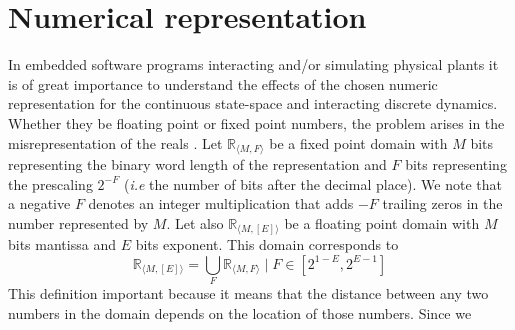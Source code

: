 \documentclass[sigconf]{llncs}
\newcommand{\jrronly}[1]{{}}
\begin{document}
\section{Numerical representation} 
\label{sec:numeric_rep}

In embedded software programs interacting and/or simulating physical plants
it is of great importance to understand the effects of the chosen numeric 
representation for the continuous state-space and interacting discrete dynamics. 
\jrronly{
These representations are almost invariably approximations to the original
which are assumed to be precise enough as to not cause any trouble,
but it is precisely this assumption that often results in the most difficult and
dangerous errors.
There are generally speaking two formats for representing numbers in
programs. On one hand we have variable word length types which will
attempt to use as much memory as needed to precisely represent the
original domain (usually the reals). In this case the limitations are caused
by memory and speed, both of which are directly affected by the
increasingly larger word lengths. Multiple precision floating-point arithmetic
and software rationals are good examples of these cases. It is possible for
some of these data types to have memory constraints, at which point they
fall into the second category.
Fixed precision data types are most common in software programs.
}
Whether they be floating point or fixed point
\jrronly{ (of which integers are the special case for 0 decimal places) }
numbers, the problem arises in the misrepresentation of the reals%
\jrronly{ (or equivalent data type being represented) }.
Let $\mathbb{R}_{\langle M,F \rangle}$ be a fixed point domain with $M$ bits
representing the binary word length of the representation and $F$ bits
representing the prescaling $2^{-F}$ (\emph{i.e} the number of bits after
the decimal place).  We note that a negative $F$ denotes an integer
multiplication that adds $-F$ trailing zeros in the number represented by
$M$.
Let also $\mathbb{R}_{\langle M,[E] \rangle}$ be a floating point
domain with $M$ bits mantissa and $E$ bits exponent.  This domain
corresponds to $$\mathbb{R}_{\langle M,[E] \rangle} = \bigcup_F
\mathbb{R}_{\langle M,F \rangle} \mid F \in [2^{1-E}, 2^{E-1}]$$ This
definition important because it means that the distance between any two
numbers in the domain depends on the location of those numbers.  Since we
\end{document}

